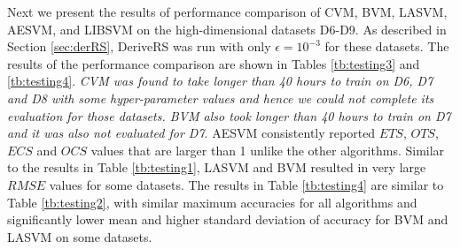 \documentclass[twoside]{article}
\begin{document}
Next we present the results of performance comparison of CVM, BVM, LASVM, AESVM, and LIBSVM on the high-dimensional datasets D6-D9. As described in Section \ref{sec:derRS}, DeriveRS was run with only $\epsilon = 10^{-3}$ for these datasets. The results of the performance comparison are shown in Tables \ref{tb:testing3} and \ref{tb:testing4}. \emph{CVM was found to take longer than 40 hours to train on D6, D7 and D8 with some hyper-parameter values and hence we could not complete its evaluation for those datasets. BVM also took longer than 40 hours to train on D7 and it was also not evaluated for D7}. AESVM consistently reported $ETS$, $OTS$, $ECS$ and $OCS$ values that are larger than 1 unlike the other algorithms. Similar to the results in Table \ref{tb:testing1}, LASVM and BVM resulted in very large $RMSE$ values for some datasets. The results in Table \ref{tb:testing4} are similar to Table \ref{tb:testing2}, with similar maximum accuracies for all algorithms and significantly lower mean and higher standard deviation of accuracy for BVM and LASVM on some datasets.
\end{document}
